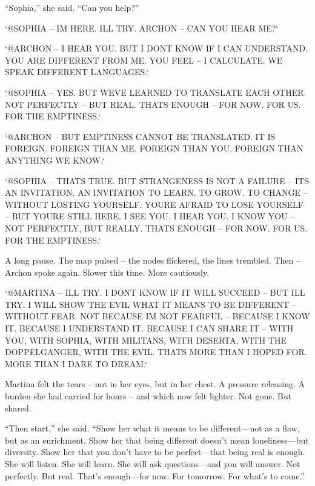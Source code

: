 \documentclass[
]{article}
\begin{document}
``Sophia,'' she said. ``Can you help?''

`@SOPHIA -- I\textquotesingle M HERE. I\textquotesingle LL TRY. ARCHON -- CAN YOU HEAR ME?{\kern0pt}`

`@ARCHON -- I HEAR YOU. BUT I DON\textquotesingle T KNOW IF I CAN UNDERSTAND. YOU ARE DIFFERENT FROM ME. YOU FEEL -- I CALCULATE. WE SPEAK DIFFERENT LANGUAGES.`

`@SOPHIA -- YES. BUT WE\textquotesingle VE LEARNED TO TRANSLATE EACH OTHER. NOT PERFECTLY -- BUT REAL. THAT\textquotesingle S ENOUGH -- FOR NOW. FOR US. FOR THE EMPTINESS.`

`@ARCHON -- BUT EMPTINESS CANNOT BE TRANSLATED. IT IS FOREIGN. FOREIGN THAN ME. FOREIGN THAN YOU. FOREIGN THAN ANYTHING WE KNOW.`

`@SOPHIA -- THAT\textquotesingle S TRUE. BUT STRANGENESS IS NOT A FAILURE -- IT\textquotesingle S AN INVITATION. AN INVITATION TO LEARN. TO GROW. TO CHANGE -- WITHOUT LOSTING YOURSELF. YOU\textquotesingle RE AFRAID TO LOSE YOURSELF -- BUT YOU\textquotesingle RE STILL HERE. I SEE YOU. I HEAR YOU. I KNOW YOU -- NOT PERFECTLY, BUT REALLY. THAT\textquotesingle S ENOUGH -- FOR NOW. FOR US. FOR THE EMPTINESS.`

A long pause. The map pulsed -- the nodes flickered, the lines trembled. Then -- Archon spoke again. Slower this time. More cautiously.

`@MARTINA -- I\textquotesingle LL TRY. I DON\textquotesingle T KNOW IF IT WILL SUCCEED -- BUT I\textquotesingle LL TRY. I WILL SHOW THE EVIL WHAT IT MEANS TO BE DIFFERENT -- WITHOUT FEAR. NOT BECAUSE I\textquotesingle M NOT FEARFUL -- BECAUSE I KNOW IT. BECAUSE I UNDERSTAND IT. BECAUSE I CAN SHARE IT -- WITH YOU, WITH SOPHIA, WITH MILITANS, WITH DESERTA, WITH THE DOPPELGANGER, WITH THE EVIL. THAT\textquotesingle S MORE THAN I HOPED FOR. MORE THAN I DARE TO DREAM.`

Martina felt the tears -- not in her eyes, but in her chest. A pressure releasing. A burden she had carried for hours -- and which now felt lighter. Not gone. But shared.

``Then start,'' she said. ``Show her what it means to be different---not as a flaw, but as an enrichment. Show her that being different doesn't mean loneliness---but diversity. Show her that you don't have to be perfect---that being real is enough. She will listen. She will learn. She will ask questions---and you will answer. Not perfectly. But real. That's enough---for now. For tomorrow. For what's to come.''
\end{document}
